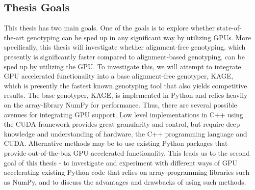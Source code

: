 \subsection{Thesis Goals} \label{introduction:thesis_goals}
This thesis has two main goals.
One of the goals is to explore whether state-of-the-art genotyping can be sped up in any significant way by utilizing GPUs.
More specifically, this thesis will investigate whether alignment-free genotyping, which presently is significantly faster compared to alignment-based genotyping, can be sped up by utilizing the GPU.
To investigate this, we will attempt to integrate GPU accelerated functionality into a base alignment-free genotyper, KAGE, which is presently the fastest known genotyping tool that also yields competitive results.
The base genotyper, KAGE, is implemented in Python and relies heavily on the array-library NumPy for performance.
Thus, there are several possible avenues for integrating GPU support. 
Low level implementations in C++ using the CUDA framework provides great granularity and control, but require deep knowledge and understanding of hardware, the C++ programming language and CUDA.
Alternative methods may be to use existing Python packages that provide out-of-the-box GPU accelerated functionality.
This leads us to the second goal of this thesis - to investigate and experiment with different ways of GPU accelerating existing Python code that relies on array-programming libraries such as NumPy, and to discuss the advantages and drawbacks of using such methods.
